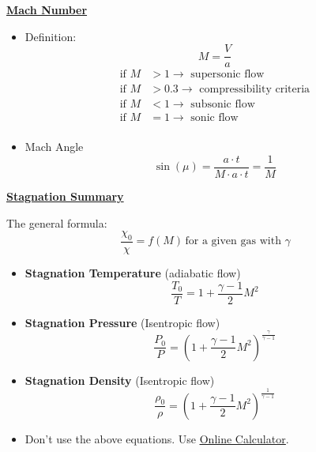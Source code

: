 \Large \textbf{\underline{\color{blue}Mach Number\color{black}}}

\begin{itemize}
    \item Definition:
    \begin{equation*}
        M = \frac{V}{a}
    \end{equation*}
    \begin{align*}
        \text{if } M &> 1 \to \text{ supersonic flow} \\
        \text{if } M &> 0.3 \to \text{ compressibility criteria} \\
        \text{if } M &< 1 \to \text{ subsonic flow} \\
        \text{if } M &= 1 \to \text{ sonic flow} \\
    \end{align*}
    \item Mach Angle
    \begin{equation*}
        \sin(\mu) = \frac{a\cdot t}{ M \cdot a \cdot t} = \frac{1}{M}
    \end{equation*}
\end{itemize}

\Large \textbf{\underline{\color{blue}Stagnation Summary\color{black}}}
\vspace{3mm}

The general formula:
\begin{equation*}
    \frac{\chi_0}{\chi} = f(M)\,\text{for a given gas with } \gamma
\end{equation*}

\begin{itemize}
    \item \textbf{Stagnation Temperature} \color{green}(adiabatic flow)\color{black}
    \begin{equation*}
        \frac{T_0}{T} = 1+ \frac{\gamma - 1}{2} M^2
    \end{equation*}
    \item \textbf{Stagnation Pressure} \color{green}(Isentropic flow) \color{black}
    \begin{equation*}
        \frac{P_0}{P} = \left(1+\frac{\gamma - 1}{2} M^2\right)^{\frac{\gamma}{\gamma-1}}
    \end{equation*}
    \item \textbf{Stagnation Density} \color{green}(Isentropic flow)\color{black}
    \begin{equation*}
        \frac{\rho_0}{\rho} = \left(1+\frac{\gamma-1}{2}M^2\right)^{\frac{1}{\gamma-1}}
    \end{equation*}
    \item Don't use the above equations. Use \href{http://www.dept.aoe.vt.edu/\~devenpor/aoe3114/calc.html}{\color{blue}\underline{Online Calculator}\color{black}}.
\end{itemize}

